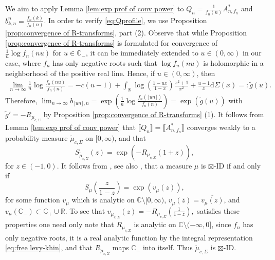 \documentclass[reqno]{amsart}
\newcommand{\1}{\mathbf{1}}
\newcommand{\dd}{\mathrm{d}}
\newcommand{\C}{\mathbb{C}}
\newcommand{\R}{\mathbb{R}}
\def\R{\mathbb{R}}
\theoremstyle{plain}
\theoremstyle{definition}
\theoremstyle{remark}
\numberwithin{equation}{section}
\begin{document}
We aim to apply Lemma \ref{lem:exp prof of conv power} to $Q_n=\frac{1}{f_n(n)}A_{n,f_n}^*$ and $b_{k,n}^n=\frac{f_n(k)}{f_n(n)}$. In order to verify \eqref{eq:Qprofile}, we use Proposition \ref{prop:convergence of R-transforms}, part (2). Observe that while Proposition \ref{prop:convergence of R-transforms} is formulated for convergence of $\frac{1}{n}\log f_n(nu)$ for $u\in\C_{-}$, it can be immediately extended to $u\in (0,\infty)$ in our case, where $f_n$ has only negative roots such that $\log f_n(nu)$ is holomorphic in a neighborhood of the positive real line.  Hence, if  $u\in(0,\infty)$, then  \begin{equation}\label{eq:log conv of mult appell}
	\begin{aligned}
		\lim\limits_{n\rightarrow\infty}\frac{1}{n}\log \frac{f_{n}(nu)}{f_n(n)}%
		=-c(u-1)+\int_{\R}\log\left(\frac{1-ux}{1-x}\right)\frac{x^2+1}{x^2}+\frac{u-1}{x}\dd\Sigma(x)=:\tilde g (u).
	\end{aligned}
	\end{equation} 
Therefore, $\lim_{n\to\infty} b_{\lfloor un\rfloor,n}=\exp(\frac{1}{n}\log \frac{f_{n}(\lfloor un\rfloor)}{f_n(n)})=\exp(\tilde{g}(u))$ with $\tilde g '=-R_{\mu_{c,\Sigma}}$ by Proposition \ref{prop:convergence of R-transforms} (1). It follows from Lemma \ref{lem:exp prof of conv power} that $\llbracket Q_n\rrbracket=\llbracket A_{n,f_n}^{*}\rrbracket$ converges weakly to a probability  measure $\tilde\mu_{c,\Sigma}$ on $[0,\infty)$, and that\begin{equation}\label{eq:S transform of mult Appell}
	S_{\tilde\mu_{c,\Sigma}}(z)=\exp\left(-R_{\mu_{c,\Sigma}}(1+z) \right),
	\end{equation} for $z\in (-1,0)$. It follows from \cite{Bercovici-Voiculescu1993}, see also \cite[Theorem 2.1]{Arizmendi-Hasebe2018}, that a measure $\mu$ is $\boxtimes$-ID if and only if \begin{equation}
	S_{\mu}\left(\frac{z}{1-z}\right)=\exp\left(v_{\mu}(z)\right),
	\end{equation} for some function $v_{\mu}$ which is analytic on $\C\setminus[0,\infty)$, $v_{\mu}(\bar{z})=\overline{v_{\mu}(z)}$, and $v_\mu(\C_-)\subset \C_+\cup\R$. To see that $
	v_{\tilde\mu_{c,\Sigma}}(z)=-R_{\mu_{c,\Sigma}}\left(\frac{1}{1-z}\right),
$ satisfies these properties one need only note that $R_{\mu_{c,\Sigma}}$ is analytic on $\C\setminus (-\infty,0]$, since $f_n$ has only negative roots, it is a real analytic function by the integral representation \eqref{eq:free levy-khin}, and that $R_{\mu_{c,\Sigma}}$ maps $\C_{-}$ into itself. Thus $\tilde\mu_{c,\Sigma}$ is $\boxtimes$-ID. 
	
\end{document}
